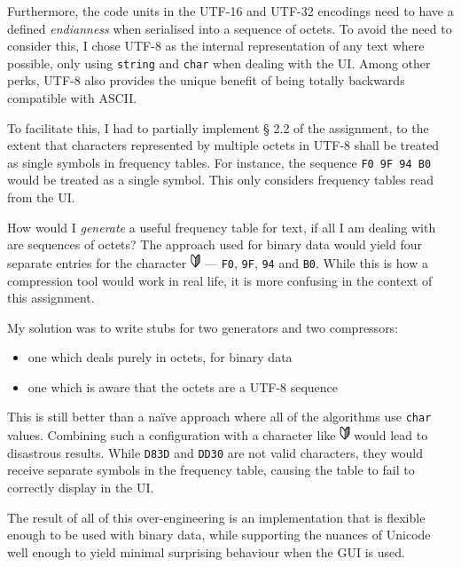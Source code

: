 \documentclass[a4paper,12pt]{article}
\begin{document}
Furthermore, the code units in the UTF-16 and UTF-32 encodings need to have a
defined \emph{endianness} when serialised into a sequence of octets. To avoid
the need to consider this, I chose UTF-8 as the internal representation of any
text where possible, only using \texttt{string} and \texttt{char} when dealing
with the UI. Among other perks, UTF-8 also provides the unique benefit of
being totally backwards compatible with ASCII.

To facilitate this, I had to partially implement § 2.2 of the assignment, to
the extent that characters represented by multiple octets in UTF-8 shall be
treated as single symbols in frequency tables. For instance, the sequence
\texttt{F0 9F 94 B0} would be treated as a single symbol. This only considers
frequency tables read from the UI.

How would I \emph{generate} a useful frequency table for text, if all I am
dealing with are sequences of octets? The approach used for binary data would
yield four separate entries for the character \includegraphics[height=12pt]
{U+01F530.png} --- \texttt{F0}, \texttt{9F}, \texttt{94} and \texttt{B0}. While
this is how a compression tool would work in real life, it is more confusing in
the context of this assignment.

My solution was to write stubs for two generators and two compressors:

\begin{itemize}
	\item
		one which deals purely in octets, for binary data
	\item
		one which is aware that the octets are a UTF-8 sequence
\end{itemize}

This is still better than a naïve approach where all of the algorithms use
\texttt{char} values. Combining such a configuration with a character like
\includegraphics[height=12pt]{U+01F530.png} would lead to disastrous results.
While \texttt{D83D} and \texttt{DD30} are not valid characters, they would
receive separate symbols in the frequency table, causing the table to fail to
correctly display in the UI.

The result of all of this over-engineering is an implementation that is
flexible enough to be used with binary data, while supporting the nuances of
Unicode well enough to yield minimal surprising behaviour when the GUI is used.
\end{document}
